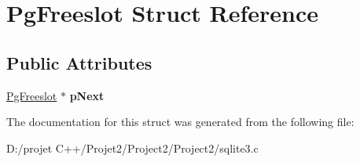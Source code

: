 \hypertarget{struct_pg_freeslot}{}\section{Pg\+Freeslot Struct Reference}
\label{struct_pg_freeslot}
\subsection*{Public Attributes}
\begin{DoxyCompactItemize}
\item 
\mbox{\label{struct_pg_freeslot_ac38a6e51f86c650fb943585d7b6c8b70}} 
\mbox{\hyperlink{struct_pg_freeslot}{Pg\+Freeslot}} $\ast$ {\bfseries p\+Next}
\end{DoxyCompactItemize}


The documentation for this struct was generated from the following file\+:\begin{DoxyCompactItemize}
\item 
D\+:/projet C++/\+Projet2/\+Project2/\+Project2/sqlite3.\+c\end{DoxyCompactItemize}
